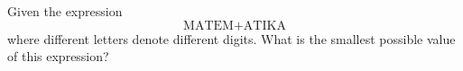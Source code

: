 Given the expression \[\text{MATEM}+\text{ATIKA}\]where different letters denote different digits. What is the smallest possible value of this expression?
